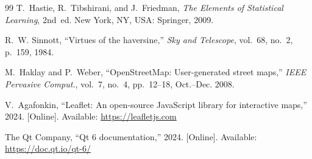 \documentclass[conference]{IEEEtran}
\begin{document}
\begin{thebibliography}{99}
T.~Hastie, R.~Tibshirani, and J.~Friedman, \emph{The Elements of
Statistical Learning}, 2nd~ed. New York, NY, USA: Springer, 2009.

R.~W. Sinnott, ``Virtues of the haversine,'' \emph{Sky and Telescope},
vol.~68, no.~2, p.~159, 1984.

M.~Haklay and P.~Weber, ``OpenStreetMap: User-generated street maps,''
\emph{IEEE Pervasive Comput.}, vol.~7, no.~4, pp.~12--18, Oct.--Dec. 2008.

V.~Agafonkin, ``Leaflet: An open-source JavaScript library for
interactive maps,'' 2024. [Online]. Available: \url{https://leafletjs.com}

The Qt Company, ``Qt 6 documentation,'' 2024. [Online]. Available:
\url{https://doc.qt.io/qt-6/}

\end{thebibliography}
\end{document}
